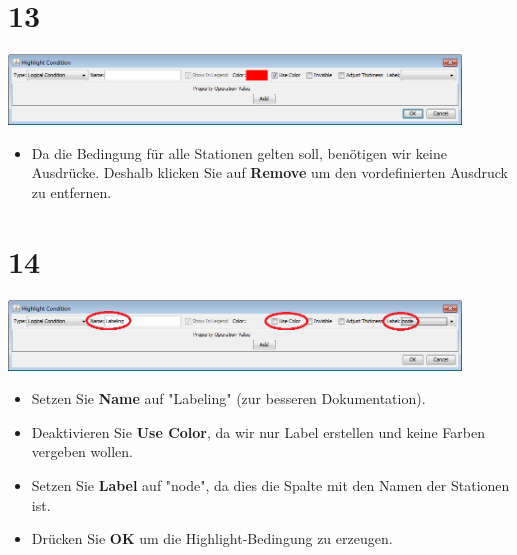 \documentclass{beamer}
\begin{document}
\section{13}
\begin{frame}
	\begin{center}
  		\includegraphics[width=0.9\textwidth]{13.png}
	\end{center}
	\begin{itemize}
		\item Da die Bedingung für alle Stationen gelten soll, benötigen wir keine Ausdrücke. Deshalb klicken Sie auf \textbf{Remove} um den vordefinierten Ausdruck zu entfernen.
	\end{itemize}
\end{frame}

\section{14}
\begin{frame}
	\begin{center}
  		\includegraphics[width=0.9\textwidth]{14.png}
	\end{center}
	\begin{itemize}
		\item Setzen Sie \textbf{Name} auf "Labeling" (zur besseren Dokumentation).
		\item Deaktivieren Sie \textbf{Use Color}, da wir nur Label erstellen und keine Farben vergeben wollen.
		\item Setzen Sie \textbf{Label} auf "node", da dies die Spalte mit den Namen der Stationen ist.
		\item Drücken Sie \textbf{OK} um die Highlight-Bedingung zu erzeugen.
	\end{itemize}
\end{frame}
\end{document}
